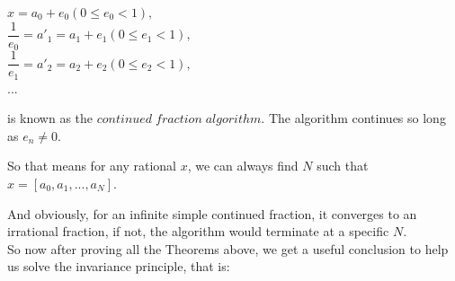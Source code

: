 \documentclass[12pt]{article}
\begin{document}
\begin{center}
$x=a_0+e_0 (0\leq e_0<1),$\\
$\dfrac{1}{e_0}=a'_1=a_1+e_1 (0\leq e_1<1),$\\
$\dfrac{1}{e_1}=a'_2=a_2+e_2 (0\leq e_2<1),$\\
$...$
\end{center}
is known as the $continued\;fraction\;algorithm$. The algorithm continues so long as $e_n\neq0$.
\par So that means for any rational $x$, we can always find $N$ such that $x=[a_0,a_1,...,a_N]$.
\par And obviously, for an infinite simple continued fraction, it converges to an irrational fraction, if not, the algorithm would terminate at a specific $N$.\\

So now after proving all the Theorems above, we get a useful conclusion to help us solve the invariance principle, that is:
\end{document}
